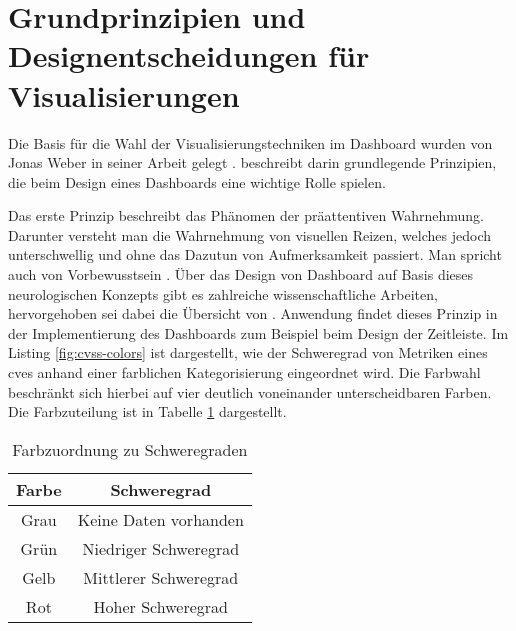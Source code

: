 \section{Grundprinzipien und Designentscheidungen für Visualisierungen}
\label{sec:auswahlDerVisualisierungstechniken}
Die Basis für die Wahl der Visualisierungstechniken im Dashboard wurden von Jonas Weber in seiner Arbeit gelegt \autocite{weberEvaluationDashboardTechniques}. \citeauthor{weberEvaluationDashboardTechniques} beschreibt darin grundlegende Prinzipien, die beim Design eines Dashboards eine wichtige Rolle spielen.
\par Das erste Prinzip beschreibt das Phänomen der präattentiven Wahrnehmung. Darunter versteht man die Wahrnehmung von visuellen Reizen, welches jedoch unterschwellig und ohne das Dazutun von Aufmerksamkeit passiert. Man spricht auch von Vorbewusstsein \autocite{PraeattentiveWahrnehmung,mallotWahrnehmungPraeattentiveIm2021}. Über das Design von Dashboard auf Basis dieses neurologischen Konzepts gibt es zahlreiche wissenschaftliche Arbeiten, hervorgehoben sei dabei die Übersicht von \citeauthor{barrera-leonHowPreattentiveProcess2023} \autocite{barrera-leonHowPreattentiveProcess2023}. Anwendung findet dieses Prinzip in der Implementierung des Dashboards zum Beispiel beim Design der Zeitleiste. Im Listing \ref{fig:cvss-colors} ist dargestellt, wie der Schweregrad von Metriken eines \glspl{cve} anhand einer farblichen Kategorisierung eingeordnet wird. Die Farbwahl beschränkt sich hierbei auf vier deutlich voneinander unterscheidbaren Farben. Die Farbzuteilung ist in Tabelle \ref{tab:severity-color-mapping} dargestellt.
\begin{table}[H]
    \centering
    \caption{Farbzuordnung zu Schweregraden}
    \begin{tabular}{|c|c|}
        \hline
        \textbf{Farbe}                & \textbf{Schweregrad}  \\
        \hline
        \cellcolor[HTML]{6c757d} Grau & Keine Daten vorhanden \\
        \hline
        \cellcolor[HTML]{198754} Grün & Niedriger Schweregrad \\
        \hline
        \cellcolor[HTML]{ffc107} Gelb & Mittlerer Schweregrad \\
        \hline
        \cellcolor[HTML]{dc3545} Rot  & Hoher Schweregrad     \\
        \hline
    \end{tabular}
    \label{tab:severity-color-mapping}
\end{table}

